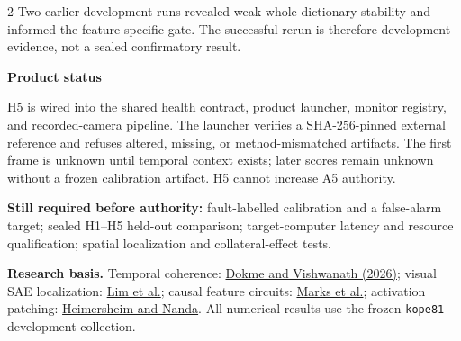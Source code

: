 \documentclass[9pt]{article}
\begin{document}
\begin{multicols}{2}
Two earlier development runs revealed weak whole-dictionary stability and
informed the feature-specific gate. The successful rerun is therefore
development evidence, not a sealed confirmatory result.

{\large\bfseries\color{hnavy} Product status}

H5 is wired into the shared health contract, product launcher, monitor registry,
and recorded-camera pipeline. The launcher verifies a SHA-256-pinned external
reference and refuses altered, missing, or method-mismatched artifacts. The
first frame is unknown until temporal context exists; later scores remain
unknown without a frozen calibration artifact. H5 cannot increase A5 authority.

\textbf{Still required before authority:} fault-labelled calibration and a
false-alarm target; sealed H1--H5 held-out comparison; target-computer latency
and resource qualification; spatial localization and collateral-effect tests.

{\footnotesize\textbf{Research basis.} Temporal coherence:
\href{https://arxiv.org/abs/2604.03919}{Dokme and Vishwanath (2026)};
visual SAE localization: \href{https://arxiv.org/abs/2412.05276}{Lim et al.};
causal feature circuits: \href{https://arxiv.org/abs/2403.19647}{Marks et al.};
activation patching: \href{https://arxiv.org/abs/2404.15255}{Heimersheim and Nanda}.
All numerical results use the frozen \texttt{kope81} development collection.}
\end{multicols}
\end{document}
